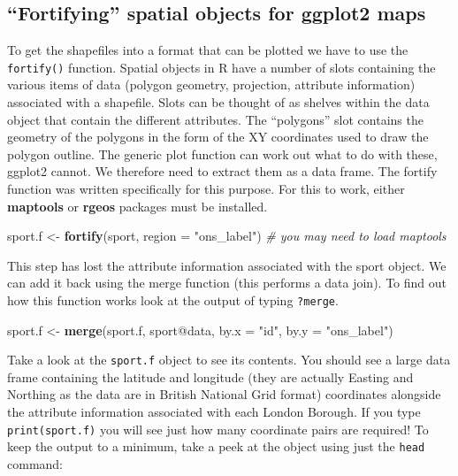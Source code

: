 \documentclass[]{article}
\newenvironment{Shaded}{}{}
\newcommand{\KeywordTok}[1]{\textcolor[rgb]{0.00,0.44,0.13}{\textbf{{#1}}}}
\newcommand{\DataTypeTok}[1]{\textcolor[rgb]{0.56,0.13,0.00}{{#1}}}
\newcommand{\StringTok}[1]{\textcolor[rgb]{0.25,0.44,0.63}{{#1}}}
\newcommand{\CommentTok}[1]{\textcolor[rgb]{0.38,0.63,0.69}{\textit{{#1}}}}
\newcommand{\NormalTok}[1]{{#1}}
\begin{document}
\subsection{``Fortifying'' spatial objects for ggplot2
maps}\label{fortifying-spatial-objects-for-ggplot2-maps}

To get the shapefiles into a format that can be plotted we have to use
the \texttt{fortify()} function. Spatial objects in R have a number of
slots containing the various items of data (polygon geometry,
projection, attribute information) associated with a shapefile. Slots
can be thought of as shelves within the data object that contain the
different attributes. The ``polygons'' slot contains the geometry of the
polygons in the form of the XY coordinates used to draw the polygon
outline. The generic plot function can work out what to do with these,
ggplot2 cannot. We therefore need to extract them as a data frame. The
fortify function was written specifically for this purpose. For this to
work, either \textbf{maptools} or \textbf{rgeos} packages must be
installed.

\begin{Shaded}
\begin{Highlighting}[]
\NormalTok{sport.f <-}\StringTok{ }\KeywordTok{fortify}\NormalTok{(sport, }\DataTypeTok{region =} \StringTok{"ons_label"}\NormalTok{)  }\CommentTok{# you may need to load maptools}
\end{Highlighting}
\end{Shaded}

This step has lost the attribute information associated with the sport
object. We can add it back using the merge function (this performs a
data join). To find out how this function works look at the output of
typing \texttt{?merge}.

\begin{Shaded}
\begin{Highlighting}[]
\NormalTok{sport.f <-}\StringTok{ }\KeywordTok{merge}\NormalTok{(sport.f, sport@data, }\DataTypeTok{by.x =} \StringTok{"id"}\NormalTok{, }\DataTypeTok{by.y =} \StringTok{"ons_label"}\NormalTok{)}
\end{Highlighting}
\end{Shaded}

Take a look at the \texttt{sport.f} object to see its contents. You
should see a large data frame containing the latitude and longitude
(they are actually Easting and Northing as the data are in British
National Grid format) coordinates alongside the attribute information
associated with each London Borough. If you type \texttt{print(sport.f)}
you will see just how many coordinate pairs are required! To keep the
output to a minimum, take a peek at the object using just the
\texttt{head} command:
\end{document}
